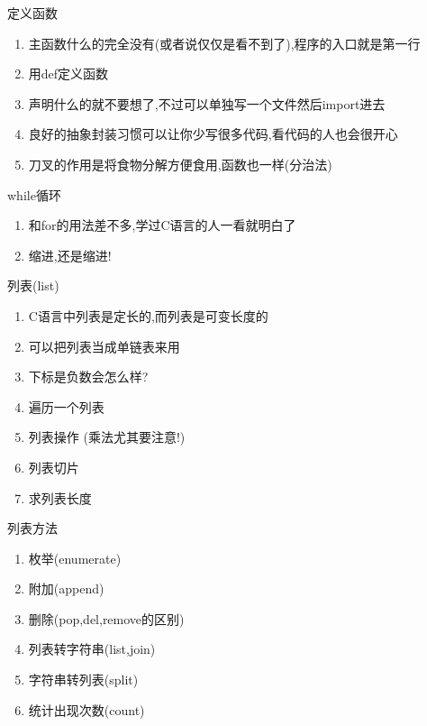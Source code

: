 \documentclass{beamer}
\begin{document}
\begin{frame}{定义函数}
\begin{enumerate}
\item 主函数什么的完全没有(或者说仅仅是看不到了),程序的入口就是第一行
\item 用def定义函数
\item 声明什么的就不要想了,不过可以单独写一个文件然后import进去
\item 良好的抽象封装习惯可以让你少写很多代码,看代码的人也会很开心
\item 刀叉的作用是将食物分解方便食用,函数也一样(分治法)

\end{enumerate}
\end{frame}

\begin{frame}{while循环}
\begin{enumerate}
\item 和for的用法差不多,学过C语言的人一看就明白了
\item 缩进,还是缩进!
\end{enumerate}
\end{frame}

\begin{frame}{列表(list)}
\begin{enumerate}
\item C语言中列表是定长的,而列表是可变长度的
\item 可以把列表当成单链表来用
\item 下标是负数会怎么样?
\item 遍历一个列表
\item 列表操作 (乘法尤其要注意!)
\item 列表切片
\item 求列表长度

\end{enumerate}
\end{frame}

\begin{frame}{列表方法}
\begin{enumerate}
\item 枚举(enumerate)
\item 附加(append)
\item 删除(pop,del,remove的区别) %
\item 列表转字符串(list,join)
\item 字符串转列表(split)
\item 统计出现次数(count)
\end{enumerate}
\end{frame}
\end{document}
